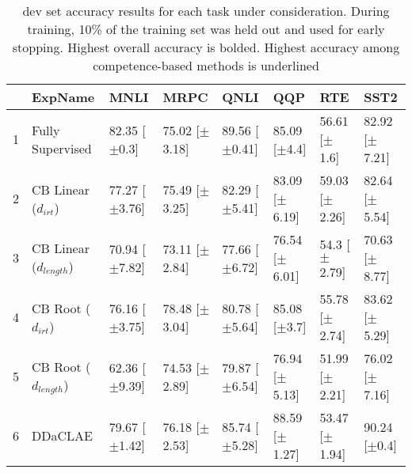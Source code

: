 \begin{table}[ht]
\centering
\begin{tabular}{rlllllll}
  \toprule
 & ExpName & MNLI & MRPC & QNLI & QQP & RTE & SST2 \\ 
  \midrule
1 & Fully Supervised & 82.35 [$\pm$0.3] & 75.02 [$\pm$3.18] & 89.56 [$\pm$0.41] & 85.09 [$\pm$4.4] & 56.61 [$\pm$1.6] & 82.92 [$\pm$7.21] \\ 
  2 & CB Linear ($d_{irt}$) & 77.27 [$\pm$3.76] & 75.49 [$\pm$3.25] & 82.29 [$\pm$5.41] & 83.09 [$\pm$6.19] & 59.03 [$\pm$2.26] & 82.64 [$\pm$5.54] \\ 
  3 & CB Linear ($d_{length}$) & 70.94 [$\pm$7.82] & 73.11 [$\pm$2.84] & 77.66 [$\pm$6.72] & 76.54 [$\pm$6.01] & 54.3 [$\pm$2.79] & 70.63 [$\pm$8.77] \\ 
  4 & CB Root ($d_{irt}$) & 76.16 [$\pm$3.75] & 78.48 [$\pm$3.04] & 80.78 [$\pm$5.64] & 85.08 [$\pm$3.7] & 55.78 [$\pm$2.74] & 83.62 [$\pm$5.29] \\ 
  5 & CB Root ($d_{length}$) & 62.36 [$\pm$9.39] & 74.53 [$\pm$2.89] & 79.87 [$\pm$6.54] & 76.94 [$\pm$5.13] & 51.99 [$\pm$2.21] & 76.02 [$\pm$7.16] \\ 
  6 & DDaCLAE & 79.67 [$\pm$1.42] & 76.18 [$\pm$2.53] & 85.74 [$\pm$5.28] & 88.59 [$\pm$1.27] & 53.47 [$\pm$1.94] & 90.24 [$\pm$0.4] \\ 
   \bottomrule
\end{tabular}
\caption{dev set accuracy results for each task under consideration. During training, 10\% of the training set was held out and used for early stopping. Highest overall accuracy is bolded. Highest accuracy among competence-based methods is underlined} 
\end{table}
